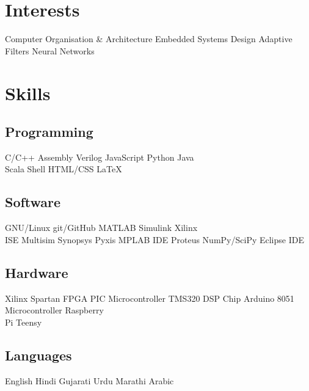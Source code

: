 \documentclass[]{deedy}
\begin{document}
\begin{minipage}[t]{0.25\textwidth} 
\begin{flushleft}
%
\section{Interests}
Computer Organisation \& Architecture \textbullet{} Embedded Systems Design \textbullet{} Adaptive Filters \textbullet{} Neural Networks
\sectionsep
%
\section{Skills}
\subsection{Programming}
C/C++ \textbullet{} Assembly \textbullet{} Verilog \textbullet{} JavaScript \textbullet{} Python \textbullet{} Java \textbullet{} \\
Scala \textbullet{} Shell \textbullet{} HTML/CSS \textbullet{} \LaTeX\ 
%
\subsection{Software}
GNU/Linux \textbullet{} git/GitHub \textbullet{} MATLAB \textbullet{} Simulink \textbullet{} Xilinx \\
ISE \textbullet{} Multisim \textbullet{} Synopsys \textbullet{} Pyxis \textbullet{} MPLAB IDE \textbullet{} Proteus \textbullet{} NumPy/SciPy \textbullet{} Eclipse IDE
%
\subsection{Hardware}
Xilinx Spartan FPGA \textbullet{} PIC Microcontroller \textbullet{} TMS320 DSP Chip \textbullet{} Arduino \textbullet{} 8051 Microcontroller \textbullet{} Raspberry \\
Pi \textbullet{} Teensy
%
\subsection{Languages}
English \textbullet{} Hindi \textbullet{} Gujarati \textbullet{} Urdu \textbullet{} Marathi \textbullet{} Arabic
\sectionsep
%

\end{flushleft}
\end{minipage}
\end{document}
